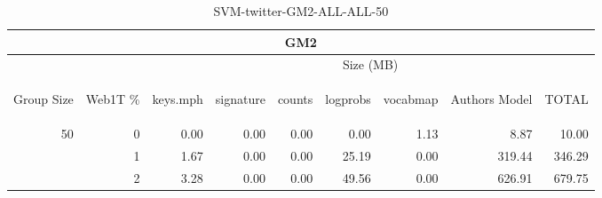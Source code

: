 \begin{center}
\begin{table}[htbp] 
 \begin{center}
\begin{tabular}{ | r | r | r | r | r | r | r | r | r |}
\hline
\multicolumn{9}{|c|}{GM2}\\
\hline
 & & \multicolumn{7}{|c|}{Size (MB)}\\ \cline{3-9}
\begin{sideways}Group Size\end{sideways} & \begin{sideways}Web1T \% \end{sideways} & \begin{sideways}keys.mph\end{sideways} & \begin{sideways}signature\end{sideways} & \begin{sideways}counts\end{sideways} & \begin{sideways}logprobs\end{sideways} & \begin{sideways}vocabmap\end{sideways} & \begin{sideways}Authors Model \end{sideways} & \begin{sideways}TOTAL\end{sideways}\\
\hline
\multirow{2}{*}{50}
 & 0 & 0.00 & 0.00 & 0.00 & 0.00 & 1.13 & 8.87 & 10.00\\ \cline{2-9}
 & 1 & 1.67 & 0.00 & 0.00 & 25.19 & 0.00 & 319.44 & 346.29\\ \cline{2-9}
 & 2 & 3.28 & 0.00 & 0.00 & 49.56 & 0.00 & 626.91 & 679.75\\ \cline{2-9}
\hline
\end{tabular}
\caption{SVM-twitter-GM2-ALL-ALL-50}
\label{table:SVM-twitter-GM2-ALL-ALL-50}
\end{center}
 \end{table}
\end{center}

